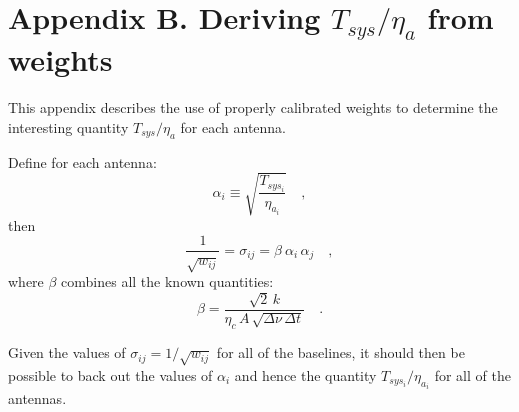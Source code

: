 \documentclass[11pt]{article}
\begin{document}

\

\section*{Appendix B.  Deriving $T_{sys} / \eta_a$ from weights}

This appendix describes the use of properly calibrated weights to
determine the interesting quantity $T_{sys} / \eta_a$ for each antenna.

Define for each antenna:
\begin{equation}
   \alpha_i \equiv \sqrt{\frac{T_{sys_i}}{\eta_{a_i}}} \quad ,
\end{equation}
then
\begin{equation}
   \frac{1}{\sqrt{w_{ij}}} = \sigma_{ij} = \beta \ \alpha_i \, \alpha_j
   \quad ,
\end{equation}
where $\beta$ combines all the known quantities:
\begin{equation}
   \beta = \frac{\sqrt{2} \, k}
                {\eta_c \, A \, \sqrt{\Delta\nu \, \Delta{t}}}
  \quad .
\end{equation}

Given the values of $\sigma_{ij} = 1 / \sqrt{w_{ij}}$ for all of the
baselines, it should then be possible to back out the values of
$\alpha_i$ and hence the quantity $T_{sys_i} / \eta_{a_i}$ for all of
the antennas.
\end{document}
